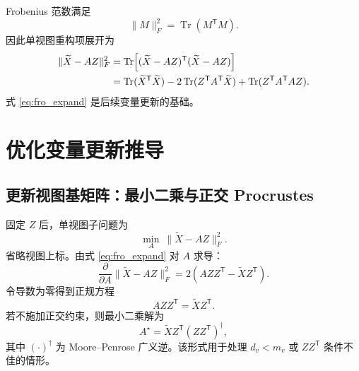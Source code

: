 \documentclass[UTF8,a4paper,12pt,fontset=none]{ctexart}
\newcommand{\tr}{\operatorname{Tr}}
\newcommand{\T}{\mathsf{T}}
\begin{document}
Frobenius 范数满足
\begin{equation}
\|M\|_F^2=\tr(M^\T M).
\end{equation}
因此单视图重构项展开为
\begin{align}
\|\widetilde X-AZ\|_F^2
&=
\tr\!\left[
(\widetilde X-AZ)^\T
(\widetilde X-AZ)
\right]\notag\\
&=
\tr(\widetilde X^\T\widetilde X)
-2\tr(Z^\T A^\T\widetilde X)
+\tr(Z^\T A^\T A Z).
\label{eq:fro_expand}
\end{align}
式 \eqref{eq:fro_expand} 是后续变量更新的基础。

\section{优化变量更新推导}

\subsection{更新视图基矩阵：最小二乘与正交 Procrustes}

固定 \(Z\) 后，单视图子问题为
\begin{equation}
\min_A\ \|\widetilde X-AZ\|_F^2 .
\label{eq:a_subproblem}
\end{equation}
省略视图上标。由式 \eqref{eq:fro_expand} 对 \(A\) 求导：
\begin{equation}
\frac{\partial}{\partial A}
\|\widetilde X-AZ\|_F^2
=2(AZZ^\T-\widetilde XZ^\T).
\end{equation}
令导数为零得到正规方程
\begin{equation}
AZZ^\T=\widetilde XZ^\T .
\end{equation}
若不施加正交约束，则最小二乘解为
\begin{equation}
A^\star=\widetilde XZ^\T(ZZ^\T)^\dagger ,
\label{eq:a_lsq}
\end{equation}
其中 \((\cdot)^\dagger\) 为 Moore--Penrose 广义逆。该形式用于处理 \(d_v<m_v\) 或 \(ZZ^\T\) 条件不佳的情形。
\end{document}
